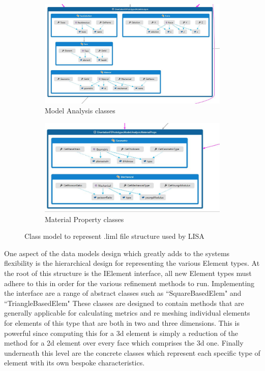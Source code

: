 \documentclass{article}
\begin{document}
\begin{figure}
\centering
\begin{subfigure}{.5\textwidth}
  \centering
  \includegraphics[width=0.9\linewidth]{DissoFEProto-ModelAnalysis.jpg}
  \caption{Model Analysis classes}
  \label{fig:sub1}
\end{subfigure}%
\begin{subfigure}{.5\textwidth}
  \centering
  \includegraphics[width=0.9\linewidth]{DissoFEProto-MaterialProps.jpg}
  \caption{Material Property classes}
  \label{fig:sub2}
\end{subfigure}
\label{fig:test}
\caption{Class model to represent .liml file structure used by LISA}
\end{figure}

\clearpage
\noindent
One aspect of the data models design which greatly adds to the systems flexibility is the hierarchical design for representing the various Element types. At the root of this structure is the IElement interface, all new Element types must adhere to this in order for the various refinement methods to run. Implementing the interface are a range of abstract classes such as ``SquareBasedElem" and ``TriangleBasedElem" These classes are designed to contain methods that are generally applicable for calculating metrics and re meshing individual elements for elements of this type that are both in two and three dimensions. This is powerful since computing this for a 3d element is simply a reduction of the method for a 2d element over every face which comprises the 3d one. Finally underneath this level are the concrete classes which represent each specific type of element with its own bespoke characteristics. \\ 
\end{document}
